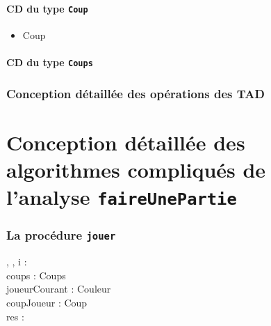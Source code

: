 \documentclass[11pt]{article}
\begin{document}
\subsection{CD du type \tt{Coup}}
\begin{itemize}\item
\begin{algorithme}
\begin{enregistrement}{Coup}
\end{enregistrement}
\end{algorithme} 
\end{itemize}

\subsection{CD du type \tt{Coups}}
\begin{itemize}
\end{itemize}

\section{Conception détaillée des opérations des TAD}

\part{Conception détaillée des algorithmes compliqués de l'analyse \tt{faireUnePartie}}
\setcounter{section}{0}
\section{La procédure \tt{jouer}}
\begin{algorithme}
	{, , }
	{i : \naturel \\
	coups : Coups \\
	joueurCourant : Couleur \\
	coupJoueur : Coup \\
	res : \booleen}
	{
	
	}
\end{algorithme}
\end{document}
